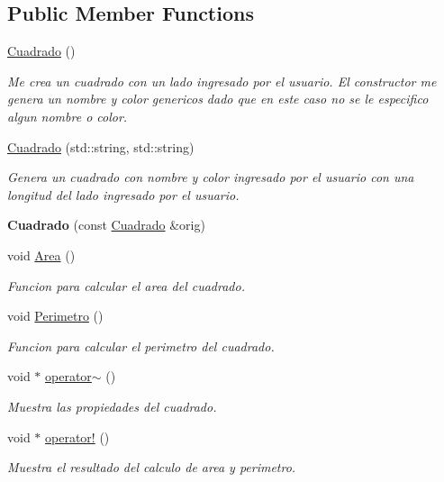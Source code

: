 \subsection*{Public Member Functions}
\begin{DoxyCompactItemize}
\item 
\hyperlink{class_cuadrado_ad28d9dddc29e1987ec620b07b0a4acc9}{Cuadrado} ()
\begin{DoxyCompactList}\small\item\em Me crea un cuadrado con un lado ingresado por el usuario. El constructor me genera un nombre y color genericos dado que en este caso no se le especifico algun nombre o color. \end{DoxyCompactList}\item 
\hyperlink{class_cuadrado_a1cdcb72a3c1475420599130e7488c6ad}{Cuadrado} (std\+::string, std\+::string)
\begin{DoxyCompactList}\small\item\em Genera un cuadrado con nombre y color ingresado por el usuario con una longitud del lado ingresado por el usuario. \end{DoxyCompactList}\item 
{\bfseries Cuadrado} (const \hyperlink{class_cuadrado}{Cuadrado} \&orig)\hypertarget{class_cuadrado_a51f15bc1eb52008d394ac1191e257aeb}{}\label{class_cuadrado_a51f15bc1eb52008d394ac1191e257aeb}

\item 
void \hyperlink{class_cuadrado_a3d1411d7a4cd8734938092727009d702}{Area} ()
\begin{DoxyCompactList}\small\item\em Funcion para calcular el area del cuadrado. \end{DoxyCompactList}\item 
void \hyperlink{class_cuadrado_aa1b3dceb0c4ecfe7680f459c635e6d28}{Perimetro} ()
\begin{DoxyCompactList}\small\item\em Funcion para calcular el perimetro del cuadrado. \end{DoxyCompactList}\item 
void $\ast$ \hyperlink{class_cuadrado_a8600ccace0a61a8ba7dd0933bd344b33}{operator$\sim$} ()
\begin{DoxyCompactList}\small\item\em Muestra las propiedades del cuadrado. \end{DoxyCompactList}\item 
void $\ast$ \hyperlink{class_cuadrado_af911d1931dba68c5ed410852569f365b}{operator!} ()
\begin{DoxyCompactList}\small\item\em Muestra el resultado del calculo de area y perimetro. \end{DoxyCompactList}\end{DoxyCompactItemize}
